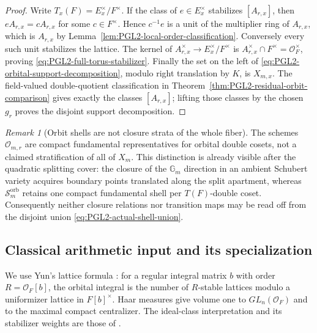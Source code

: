 \documentclass[11pt]{article}
\theoremstyle{definition}
\theoremstyle{remark}
\newtheorem{remark}[theorem]{Remark}
\begin{document}
\begin{proof}
Write $T_x(F)=E_x^\times/F^\times$.  If the class of $e\in E_x^\times$
stabilizes $[A_{r,x}]$, then
$eA_{r,x}=cA_{r,x}$ for some $c\in F^\times$.  Hence
$c^{-1}e$ is a unit of the multiplier ring of $A_{r,x}$, which is
$A_{r,x}$ by Lemma~\ref{lem:PGL2-local-order-classification}.  Conversely
every such unit stabilizes the lattice.  The kernel of
$A_{r,x}^\times\to E_x^\times/F^\times$ is
$A_{r,x}^\times\cap F^\times=\mathcal O_F^\times$, proving
\eqref{eq:PGL2-full-torus-stabilizer}.  Finally the set on the left of
\eqref{eq:PGL2-orbital-support-decomposition}, modulo right translation by
$K$, is $X_{m,x}$.  The field-valued double-quotient classification in
Theorem~\ref{thm:PGL2-residual-orbit-comparison} gives exactly the classes
$[A_{r,x}]$; lifting those classes by the chosen $g_r$ proves the disjoint
support decomposition.
\end{proof}

\begin{remark}[Orbit shells are not closure strata of the whole fiber]
The schemes $\mathscr O_{m,r}$ are compact fundamental representatives for
orbital double cosets, not a claimed stratification of all of $X_m$.  This
distinction is already visible after the quadratic splitting cover: the
closure of the $\mathbb G_m$ direction in an ambient Schubert variety acquires
boundary points translated along the split apartment, whereas
$\mathscr S_m^{\mathrm{orb}}$ retains one compact fundamental shell per
$T(F)$-double coset.  Consequently neither closure relations nor transition
maps may be read off from the disjoint union
\eqref{eq:PGL2-actual-shell-union}.
\end{remark}

\subsection{Classical arithmetic input and its specialization}

We use Yun's lattice formula \cite[\S4.2, (4.1)]{YunOrbitalOrders}:
for a regular integral matrix $b$ with order $R=\mathcal O_F[b]$, the
orbital integral is the number of $R$-stable lattices modulo a
uniformizer lattice in $F[b]^\times$.  Haar measures give volume one to
$GL_n(\mathcal O_F)$ and to the maximal compact centralizer.
The ideal-class interpretation and its stabilizer weights are those of
\cite[\S\S2.1, 2.9]{YunOrbitalOrders}.
\end{document}

